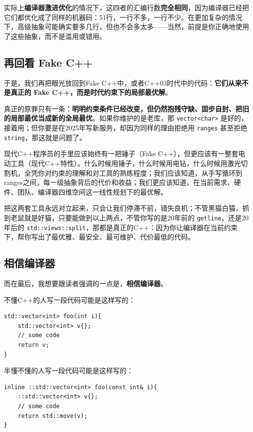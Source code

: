 实际上\textbf{编译器激进优化}的情况下，这四者的汇编行数\textbf{完全相同}，因为编译器已经把它们都优化成了同样的机器码：51行，一行不多，一行不少。在更加复杂的情况下，高级抽象可能确实要多几行，但也不会多太多——当然，前提是你正确地使用了这些抽象，而不是滥用或错用。

\subsection{再回看 Fake C++}

于是，我们再把眼光放回到Fake C++中，或者C++03时代中的代码：\textbf{它们从来不是真正的 Fake C++，而是时代约束下的局部最优解}。

真正的原罪只有一条：\textbf{明明约束条件已经改变，但仍然抱残守缺、固步自封、把旧的局部最优当成新的全局最优}。如果你维护的是老库，那 \texttt{vector<char>} 是好的，接着用；但你要是在2025年写新服务，却因为同样的理由拒绝用 \texttt{ranges} 甚至拒绝 \texttt{string}，那这就是问题了。

现代C++程序员的手里应该始终有一把锤子（Fake C++），但更应该有一整套电动工具（现代C++特性）。什么时候用锤子，什么时候用电钻，什么时候用激光切割机，全凭你对约束的理解和对工具的熟练程度；我们应该知道，从手写循环到ranges之间，每一级抽象背后的代价和收益；我们更应该知道，在当前需求、硬件、团队、编译器四维空间这一线性规划下的最优解。

把这两套工具永远对立起来，只会让我们停滞不前，错失良机；不管黑猫白猫，抓到老鼠就是好猫，只要能做到以上两点，不管你写的是20年前的 \texttt{getline}，还是20年后的 \texttt{std::views::split}，那都是真正的C++：因为你让编译器在当前约束下，帮你写出了最优雅、最安全、最可维护、代价最低的代码。

\subsection{相信编译器}

而在最后，我想要跟读者强调的一点是，\textbf{相信编译器}。

不懂C++的人写一段代码可能是这样写的：
\begin{verbatim}
std::vector<int> foo(int i){
    std::vector<int> v{};
    // some code
    return v;
}
\end{verbatim}

半懂不懂的人写一段代码可能是这样写的：
\begin{verbatim}
inline ::std::vector<int> foo(const int& i){
    ::std::vector<int> v{};
    // some code
    return std::move(v);
}
\end{verbatim}

